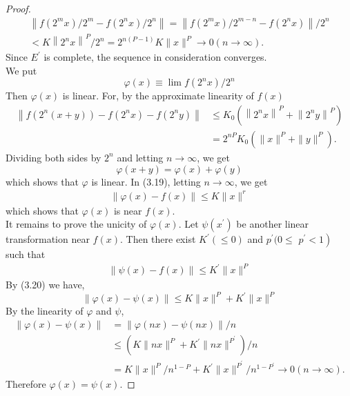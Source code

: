 \documentclass[a4paper,12pt]{report}
\begin{document}
\begin{thm}
\begin{proof}
$$\begin{aligned}
	\left\|f\left(2^{m} x\right) / 2^{m}-f\left(2^{n} x\right) / 2^{n}\right\|=\left\|f\left(2^{m} x\right) / 2^{m-n}-f\left(2^{n} x\right)\right\| / 2^{n} \\
	<K\left\|2^{n} x\right\|^{P} / 2^{n}=2^{n(P-1)} K\|x\|^{P} \rightarrow 0(n \rightarrow \infty) .
\end{aligned}
$$
Since $E^{\prime}$ is complete, the sequence in consideration converges.\\ We put
$$
\varphi(x) \equiv \lim f\left(2^{n} x\right) / 2^{n}
$$
Then $\varphi(x)$ is linear. For, by the approximate linearity of $f(x)$ 
\begin{align}
	\left\|f\left(2^{n}(x+y)\right)-f\left(2^{n} x\right)-f\left(2^{n} y\right)\right\|\nonumber &\leq K_{0}\left(\left\|2^{n} x\right\|^{P}+\left\|2^{n} y\right\|^{P}\right)\nonumber\\&=2^{n P} K_{0}\left(\|x\|^{P}+\|y\|^{P}\right). \nonumber
	\end{align} 
Dividing both sides by $2^{n}$ and letting $n \rightarrow \infty$, we get
$$
\varphi(x+y)=\varphi(x)+\varphi(y)
$$
which shows that $\varphi$ is linear. In (3.19), letting $n \rightarrow \infty$, we get
\begin{eqnarray}
\|\varphi(x)-f(x)\| \le K\|x\|^{r}
\end{eqnarray}
which shows that $\varphi(x)$ is near $f(x)$. \\
\indent It remains to prove the unicity of $\varphi(x)$. Let $\psi\left(x^{\prime}\right)$ be another linear transformation near $f(x)$. Then there exist $K^{\prime}(\le 0)$ and  \linebreak $p^{\prime}(0 \le$ $\left.p^{\prime}<1\right)$ such that
\begin{eqnarray}
\|\psi(x)-f(x)\| \le K^{\prime}\|x\|^{P}
\end{eqnarray}
By (3.20) we have,
$$
\|\varphi(x)-\psi(x)\| \le K\|x\|^{P}+K^{\prime}\|x\|^{P}
$$
By the linearity of $\varphi$ and $\psi$,
$$
\begin{aligned}
	\|\varphi(x)-\psi(x)\| & =\|\varphi(n x)-\psi(n x)\| / n \\
	& \leq\left(K\|n x\|^{P}+K^{\prime}\|n x\|^{P^{\prime}}\right) / n \\
	& =K\|x\|^{P} / n^{1-P}+K^{\prime}\|x\|^{P^{\prime}} / n^{1-P^{\prime}} \rightarrow 0(n \rightarrow \infty) .
\end{aligned}
$$
Therefore $\varphi(x)=\psi(x)$.
\end{proof}	
\end{thm}
\end{document}
